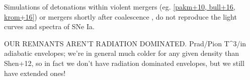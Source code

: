 Simulations of detonations within violent mergers (eg. \ref{pakm+10, bull+16, krom+16}) or mergers shortly after coalescence \citep{rask+14,vros+15}, do not reproduce the light curves and spectra of SNe Ia.  

OUR REMNANTS AREN'T RADIATION DOMINATED.  Prad/Pion \propto T^3/\rho \propto \rho in adiabatic envelopes; we're in general much colder for any given density than Shen+12, so in fact we don't have radiation dominated envelopes, but we still have extended ones!



